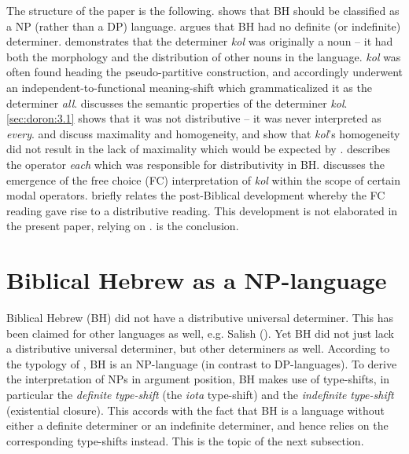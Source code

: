 \documentclass[output=paper]{langsci/langscibook}
\begin{document}
The structure of the paper is the following.  shows that BH should be classified as a NP (rather than a DP) language.  argues that BH had no definite (or indefinite) determiner.  demonstrates that the determiner \textit{kol} was originally a noun – it had both the morphology and the distribution of other nouns in the language. \textit{kol} was often found heading the pseudo-partitive construction, and accordingly underwent an independent-to-functional meaning-shift which grammaticalized it as the determiner \textit{all}.  discusses the semantic properties of the determiner \textit{kol}. \ref{sec:doron:3.1} shows that it was not distributive – it was never interpreted as \textit{every}.  and  discuss maximality and homogeneity, and show that \textit{kol}’s homogeneity did not result in the lack of maximality which would be expected by \citet{Križ2016}.  describes the operator \textit{each} which was responsible for distributivity in BH.  discusses the emergence of the free choice (FC) interpretation of \textit{kol} within the scope of certain modal operators.  briefly relates the post-Biblical development whereby the FC reading gave rise to a distributive reading. This development is not elaborated in the present paper, relying on \citet{Beck2017}.  is the conclusion.

\section{Biblical Hebrew as a NP-language}\label{sec:doron:2}%
Biblical Hebrew (BH) did not have a distributive universal determiner. This has been claimed for other languages as well, e.g. Salish (\citealt{Jelinek1993,Davis2010,DavisEtAl2014,FintelMatthewson2008,Matthewson2001, Matthewson2014}). Yet BH did not just lack a distributive universal determiner, but other determiners as well. According to the typology of \citet{Bošković2008}, BH is an NP-language (in contrast to DP-languages). To derive the interpretation of NPs in argument position, BH makes use of type-shifts, in particular the \textit{definite} \textit{type-shift} (the \textit{iota} type-shift) and the \textit{indefinite} \textit{type-shift} (existential closure). This accords with the fact that BH is a language without either a definite determiner or an indefinite determiner, and hence relies on the corresponding type-shifts instead. This is the topic of the next subsection.
\end{document}
